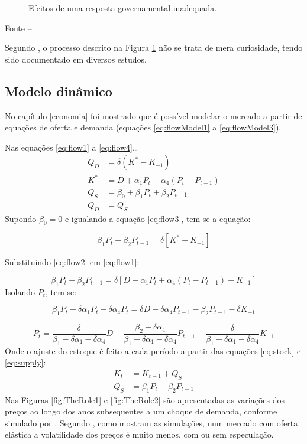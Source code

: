 \documentclass[
	12pt,				%
	oneside,			%
	a4paper,			%
	chapter=TITLE,		%
	section=TITLE,		%
	english,			%
	brazil				%
	]{abntex2}
\newcommand{\bcenter}{\begin{center}}
\newcommand{\ecenter}{\end{center}}
\begin{document}
\begin{refsection}
\begin{figure}[H]
{}

\caption{Efeitos de uma resposta governamental inadequada.}\label{fig:choque2}
\end{figure}
\bcenter

\small Fonte -- \textcite[p.~19]{Malpezzi2002TheRO}
\ecenter

Segundo \textcite[p.~19]{Malpezzi2002TheRO}, o processo descrito na Figura
\ref{fig:choque2} não se trata de mera curiosidade, tendo sido documentado em
diversos estudos.

\hypertarget{modelo-dinuxe2mico}{%
\subsection{Modelo dinâmico}\label{modelo-dinuxe2mico}}

No capítulo \ref{economia} foi mostrado que é possível modelar o mercado a
partir de equações de oferta e demanda (equações \eqref{eq:flowModel1} a
\eqref{eq:flowModel3}).

Nas equações \eqref{eq:flow1} a \eqref{eq:flow4}\ldots{}
\begin{align}
Q_D &= \delta (K^* - K_{-1}) \label{eq:flow1}\\
K^* &= D + \alpha_1 P_t + \alpha_4 (P_t - P_{t-1}) \label{eq:flow2} \\
Q_S &= \beta_0 + \beta_1 P_t + \beta_2 P_{t-1} \label{eq:flow3} \\
Q_D &= Q_S \label{eq:flow4}
\end{align}
Supondo \(\beta_0 = 0\) e igualando a equação \eqref{eq:flow3}, tem-se a equação:

\[\beta_1 P_t + \beta_2 P_{t-1} = \delta[K^* - K_{-1}]\]

Substituindo \eqref{eq:flow2} em \eqref{eq:flow1}:

\[\beta_1 P_t + \beta_2 P_{t-1} = \delta[D +\alpha_1 P_t + \alpha_4 (P_t - P_{t-1}) - K_{-1}]\]
Isolando \(P_t\), tem-se:

\[\beta_1 P_t - \delta \alpha_1 P_t -\delta \alpha_4 P_t = \delta D - \delta \alpha_4 P_{t-1} - \beta_2 P_{t-1} - \delta K_{-1}\]

\[P_t = \frac{\delta}{\beta_1 - \delta \alpha_1 - \delta \alpha_4} D - \frac{\beta_2 + \delta \alpha_4}{\beta_1 - \delta \alpha_1 - \delta \alpha_4} P_{t-1} - \frac{\delta}{\beta_1 - \delta \alpha_1 - \delta \alpha_4} K_{-1}\]
Onde o ajuste do estoque é feito a cada período a partir das equações
\eqref{eq:stock} e \eqref{eq:supply}:
\begin{align}
K_t &= K_{t-1} + Q_S \label{eq:stock}\\
Q_S &= \beta_1 P_t + \beta_2 P_{t-1} \label{eq:supply}
\end{align}
Nas Figuras \ref{fig:TheRole1} e \ref{fig:TheRole2} são apresentadas as
variações dos preços ao longo dos anos subsequentes a um choque de demanda,
conforme simulado por \textcite{Malpezzi2002TheRO}. Segundo \textcite[p.~25]{Malpezzi2002TheRO},
como mostram as simulações, num mercado com oferta elástica a volatilidade dos
preços é muito menos, com ou sem especulação.
\begin{figure}[H]


\end{figure}
\end{refsection}
\end{document}
